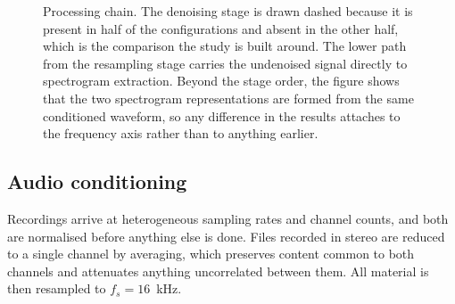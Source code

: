 \documentclass[pdflatex,sn-mathphys-num]{sn-jnl}
\begin{document}
\begin{figure}[t]
\centering
{}
\caption{Processing chain. The denoising stage is drawn dashed because it is
present in half of the configurations and absent in the other half, which is
the comparison the study is built around. The lower path from the resampling
stage carries the undenoised signal directly to spectrogram extraction.
Beyond the stage order, the figure shows that the two spectrogram
representations are formed from the same conditioned waveform, so any
difference in the results attaches to the frequency axis rather than to
anything earlier.}
\label{fig:pipeline}
\end{figure}

\subsection{Audio conditioning}\label{sec:d-cond}

Recordings arrive at heterogeneous sampling rates and channel counts, and both
are normalised before anything else is done. Files recorded in stereo are
reduced to a single channel by averaging, which preserves content common to
both channels and attenuates anything uncorrelated between them. All material
is then resampled to $f_s = 16$~kHz.
\end{document}
